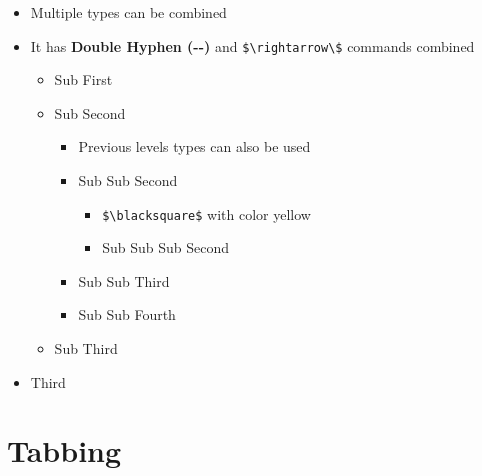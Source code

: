 \documentclass[a4paper, 10pt]{book}
\begin{document}
\begin{itemize}
	\item Multiple types can be combined
	\item It has \textbf{Double Hyphen (-\@-)} and \verb|$\rightarrow\$| commands combined
	\begin{itemize}
		\item Sub First
		\item Sub Second
		\begin{itemize}
			\item Previous levels types can also be used
			\item Sub Sub Second
			\begin{itemize}
				\item \verb|$\blacksquare$| with color yellow
				\item Sub Sub Sub Second
			\end{itemize}
			\item Sub Sub Third
			\item Sub Sub Fourth
		\end{itemize}
		\item Sub Third
	\end{itemize}
	\item Third
\end{itemize}



\chapter[Tabbing]{Tabbing}
\end{document}
